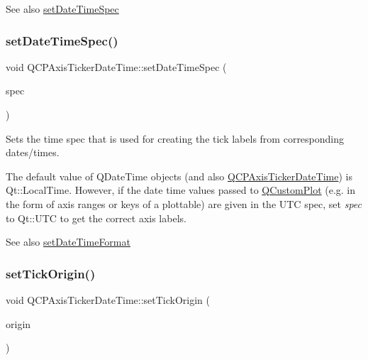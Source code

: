 \begin{DoxySeeAlso}{See also}
\hyperlink{class_q_c_p_axis_ticker_date_time_afbd987c7197e42ab61e67fb1c38abebc}{set\+Date\+Time\+Spec} 
\end{DoxySeeAlso}
\mbox{\label{class_q_c_p_axis_ticker_date_time_afbd987c7197e42ab61e67fb1c38abebc}} 
\subsubsection{\texorpdfstring{set\+Date\+Time\+Spec()}{setDateTimeSpec()}}
{\footnotesize\ttfamily void Q\+C\+P\+Axis\+Ticker\+Date\+Time\+::set\+Date\+Time\+Spec (\begin{DoxyParamCaption}\item[{Qt\+::\+Time\+Spec}]{spec }\end{DoxyParamCaption})}

Sets the time spec that is used for creating the tick labels from corresponding dates/times.

The default value of Q\+Date\+Time objects (and also \hyperlink{class_q_c_p_axis_ticker_date_time}{Q\+C\+P\+Axis\+Ticker\+Date\+Time}) is {\ttfamily Qt\+::\+Local\+Time}. However, if the date time values passed to \hyperlink{class_q_custom_plot}{Q\+Custom\+Plot} (e.\+g. in the form of axis ranges or keys of a plottable) are given in the U\+TC spec, set {\itshape spec} to {\ttfamily Qt\+::\+U\+TC} to get the correct axis labels.

\begin{DoxySeeAlso}{See also}
\hyperlink{class_q_c_p_axis_ticker_date_time_ad52660a82f688395468674d555f6a86b}{set\+Date\+Time\+Format} 
\end{DoxySeeAlso}
\mbox{\label{class_q_c_p_axis_ticker_date_time_a5388e048cbd32cf1ba730b9f1859eb5c}} 
\subsubsection{\texorpdfstring{set\+Tick\+Origin()}{setTickOrigin()}\hspace{0.1cm}{\footnotesize\ttfamily [1/2]}}
{\footnotesize\ttfamily void Q\+C\+P\+Axis\+Ticker\+Date\+Time\+::set\+Tick\+Origin (\begin{DoxyParamCaption}\item[{double}]{origin }\end{DoxyParamCaption})}

